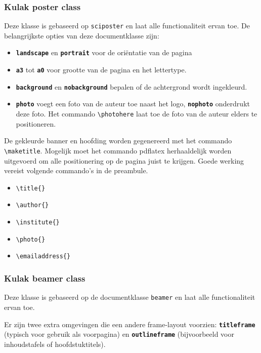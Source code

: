 \documentclass[kulak]{kulakarticle} %
\begin{document}
\subsubsection{Kulak poster class}

Deze klasse is gebaseerd op \texttt{sciposter} en laat alle functionaliteit ervan toe. De belangrijkste opties van deze documentklasse zijn:

\begin{itemize}
	\item \textbf{\texttt{landscape}} en \textbf{\texttt{portrait}} voor de oriëntatie van de pagina
	\item \textbf{\texttt{a3}} tot \textbf{\texttt{a0}} voor grootte van de pagina en het lettertype. 
	\item \textbf{\texttt{background}} en \textbf{\texttt{nobackground}} bepalen of de achtergrond wordt ingekleurd.
	\item \textbf{\texttt{photo}} voegt een foto van de auteur toe naast het logo, \textbf{\texttt{nophoto}} onderdrukt deze foto. Het commando \verb+\photohere+ laat toe de foto van de auteur elders te positioneren.
\end{itemize} 

De gekleurde banner en hoofding worden gegenereerd met het commando \verb+\maketitle+. Mogelijk moet het commando pdflatex herhaaldelijk worden uitgevoerd om alle positionering op de pagina juist te krijgen. Goede werking vereist volgende commando's in de preambule.

\begin{itemize}
	\item \verb+\title{}+
	\item \verb+\author{}+
	\item \verb+\institute{}+
	\item \verb+\photo{}+
	\item \verb+\emailaddress{}+
\end{itemize}

\subsubsection{Kulak beamer class}

Deze klasse is gebaseerd op de documentklasse \texttt{beamer} en laat alle functionaliteit ervan toe.

Er zijn twee extra omgevingen die een andere frame-layout voorzien: \textbf{\texttt{titleframe}} (typisch voor gebruik als voorpagina) en \textbf{\texttt{outlineframe}} (bijvoorbeeld voor inhoudstafels of hoofdstuktitels).
\end{document}
